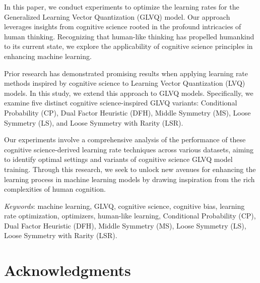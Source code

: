\documentclass[12pt,twoside]{report}
\begin{document}
\begin{spacing}{1.5}

\noindent In this paper, we conduct experiments to optimize the learning rates for the Generalized Learning Vector Quantization (GLVQ) model. Our approach leverages insights from cognitive science rooted in the profound intricacies of human thinking. Recognizing that human-like thinking has propelled humankind to its current state, we explore the applicability of cognitive science principles in enhancing machine learning.

\noindent Prior research has demonstrated promising results when applying learning rate methods inspired by cognitive science to Learning Vector Quantization (LVQ) models. In this study, we extend this approach to GLVQ models. Specifically, we examine five distinct cognitive science-inspired GLVQ variants: Conditional Probability (CP), Dual Factor Heuristic (DFH), Middle Symmetry (MS), Loose Symmetry (LS), and Loose Symmetry with Rarity (LSR).

\noindent Our experiments involve a comprehensive analysis of the performance of these cognitive science-derived learning rate techniques across various datasets, aiming to identify optimal settings and variants of cognitive science GLVQ model training. Through this research, we seek to unlock new avenues for enhancing the learning process in machine learning models by drawing inspiration from the rich complexities of human cognition.
\vspace{10pt}

\noindent \textit{Keywords}: machine learning, GLVQ, cognitive science, cognitive bias, learning rate optimization, optimizers, human-like learning, Conditional Probability (CP), Dual Factor Heuristic (DFH), Middle Symmetry (MS), Loose Symmetry (LS), Loose Symmetry with Rarity (LSR).

\end{spacing}
\chapter*{Acknowledgments}

\end{document}

